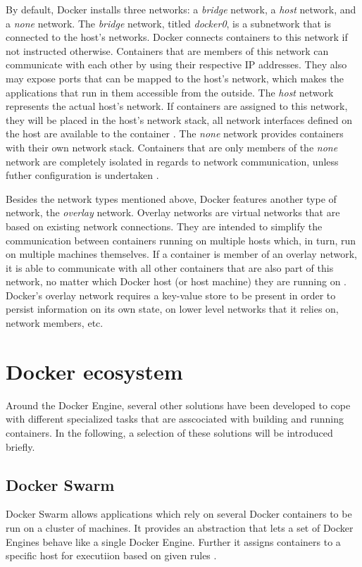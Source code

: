    By default, Docker installs three networks: a \emph{bridge} network, a \emph{host} network, and a \emph{none} network.
    The \emph{bridge} network, titled \emph{docker0}, is a subnetwork that is connected to the host's networks. Docker connects containers to this network if not instructed otherwise. Containers that are members of this network can communicate with each other by using their respective \ac{IP} addresses. They also may expose ports that can be mapped to the host's network, which makes the applications that run in them accessible from the outside.
    The \emph{host} network represents the actual host's network. If containers are assigned to this network, they will be placed in the host's network stack, \ie all network interfaces defined on the host are available to the container \cite{Docker2016Docker}.
    The \emph{none} network provides containers with their own network stack. Containers that are only members of the \emph{none} network are completely isolated in regards to network communication, unless futher configuration is undertaken \cite{Docker2016Docker}.

    Besides the network types mentioned above, Docker features another type of network, the \emph{overlay} network. Overlay networks are virtual networks that are based on existing network connections. They are intended to simplify the communication between containers running on multiple hosts which, in turn, run on multiple machines themselves. If a container is member of an overlay network, it is able to communicate with all other containers that are also part of this network, no matter which Docker host (or host machine) they are running on \cite{Docker2016Docker}.
    Docker's overlay network requires a key-value store to be present in order to persist information on its own state, \eg on lower level networks that it relies on, network members, etc.


\section{Docker ecosystem} %
\label{sec:docker_ecosystem}

   Around the Docker Engine, several other solutions have been developed to cope with different specialized tasks that are asscociated with building and running containers. In the following, a selection of these solutions will be introduced briefly.

  \subsection{Docker Swarm} %
  \label{sub:docker_swarm}
    Docker Swarm allows applications which rely on several Docker containers to be run on a cluster of machines. It provides an abstraction that lets a set of Docker Engines behave like a single Docker Engine. Further it assigns containers to a specific host for executiion based on given rules \cite{Docker2016Dockera}.

